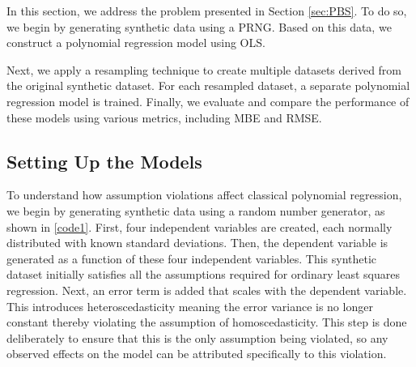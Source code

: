 


In this section, we address the problem presented in Section \ref{sec:PBS}. To do so, we begin by generating synthetic data using a PRNG. Based on this data, we construct a polynomial regression model using OLS.

\noindent Next, we apply a resampling technique to create multiple datasets derived from the original synthetic dataset. For each resampled dataset, a separate polynomial regression model is trained. Finally, we evaluate and compare the performance of these models using various metrics, including MBE and RMSE.

\subsection{Setting Up the Models}
To understand how assumption violations affect classical polynomial regression, we begin by generating synthetic data using a random number generator, as shown in \autoref{code1}. First, four independent variables are created, each normally distributed with known standard deviations. Then, the dependent variable is generated as a function of these four independent variables. This synthetic dataset initially satisfies all the assumptions required for ordinary least squares regression. Next, an error term is added that scales with the dependent variable. This introduces heteroscedasticity meaning the error variance is no longer constant thereby violating the assumption of homoscedasticity. This step is done deliberately to ensure that this is the only assumption being violated, so any observed effects on the model can be attributed specifically to this violation.
\\\\


